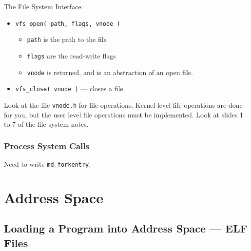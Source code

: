 \documentclass[12pt]{article}
\begin{document}
The File System Interface:
\begin{itemize}
	\item \texttt{vfs\_open( path, flags, vnode )}
		\begin{itemize}
			\item \texttt{path} is the path to the file
			\item \texttt{flags} are the read-write flags
			\item \texttt{vnode} is returned, and is an abstraction of an open
				file.
		\end{itemize}
	\item \texttt{vfs\_close( vnode )} --- closes a file
\end{itemize}

Look at the file \texttt{vnode.h} for file operations. Kernel-level file
operations are done for you, but the user level file operations must be
implemented. Look at slides 1 to 7 of the file system notes.

\subsubsection{Process System Calls}

Need to write \texttt{md\_forkentry}.

\section{Address Space}

\subsection{Loading a Program into Address Space --- ELF Files}
\end{document}
